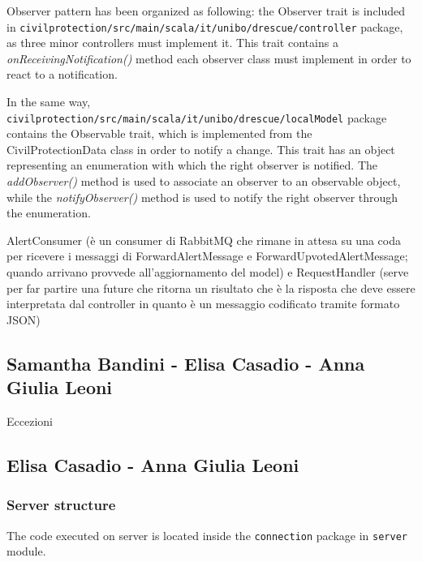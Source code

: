 \documentclass[a4paper,12pt]{report}
\begin{document}
Observer pattern has been organized as following: the Observer trait is included in \texttt{civilprotection/src/main/scala/it/unibo/drescue/controller} package, as three minor controllers must implement it. This trait contains a \textit{onReceivingNotification()} method each observer class must implement in order to react to a notification.

In the same way, \texttt{civilprotection/src/main/scala/it/unibo/drescue/localModel} package contains the Observable trait, which is implemented from the CivilProtectionData class in order to notify a change. This trait has an object representing an enumeration with which the right observer is notified. The \textit{addObserver()} method is used to associate an observer to an observable object, while the \textit{notifyObserver()} method is used to notify the right observer through the enumeration.

AlertConsumer (è un consumer di RabbitMQ che rimane in attesa su una coda per ricevere i messaggi di ForwardAlertMessage e ForwardUpvotedAlertMessage; quando arrivano provvede all'aggiornamento del model) e RequestHandler (serve per far partire una future che ritorna un risultato che è la risposta che deve essere interpretata dal controller in quanto è un messaggio codificato tramite formato JSON)

\subsection{Samantha Bandini - Elisa Casadio - Anna Giulia Leoni}
Eccezioni

\subsection{Elisa Casadio - Anna Giulia Leoni}
\subsubsection{Server structure}
The code executed on server is located inside the \texttt{connection} package in \texttt{server} module.
\end{document}

